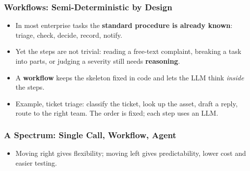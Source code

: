 \begin{frame}[fragile]\frametitle{Workflows: Semi-Deterministic by Design}
\begin{itemize}
\item In most enterprise tasks the \textbf{standard procedure is already known}: triage, check, decide, record, notify.
\item Yet the steps are not trivial: reading a free-text complaint, breaking a task into parts, or judging a severity still needs \textbf{reasoning}.
\item A \textbf{workflow} keeps the skeleton fixed in code and lets the LLM think \emph{inside} the steps.
\item Example, ticket triage: classify the ticket, look up the asset, draft a reply, route to the right team. The order is fixed; each step uses an LLM.
\end{itemize}
\end{frame}

\begin{frame}[fragile]\frametitle{A Spectrum: Single Call, Workflow, Agent}
\begin{center}
\end{center}
\begin{itemize}
\item Moving right gives flexibility; moving left gives predictability, lower cost and easier testing.
\end{itemize}
\end{frame}

